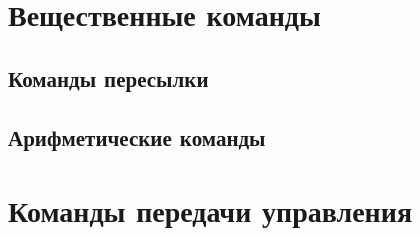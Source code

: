 \documentclass[10pt]{report}
\begin{document}
\section{Вещественные команды}
    \subsection{Команды пересылки}
    \subsection{Арифметические команды}

\section{Команды передачи управления}
\end{document}
